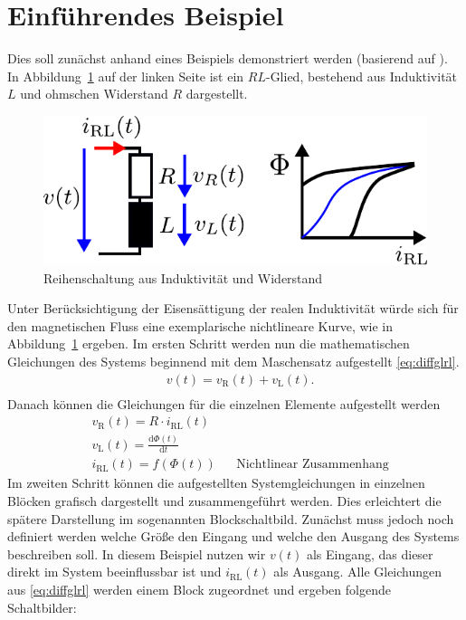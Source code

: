 \section{Einführendes Beispiel}
%
Dies soll zunächst anhand eines Beispiels demonstriert werden (basierend auf \cite{Foellinger94}). In Abbildung~\ref{fig:rlglied} auf der linken Seite ist ein $RL$-Glied, bestehend aus Induktivität $L$ und ohmschen Widerstand $R$ dargestellt.
%
\begin{figure}[h]
	\centering
	\includegraphics[width=0.5\linewidth]{Abbildungen/Modellbildung/PDF/RLglied.pdf}
	\caption{Reihenschaltung aus Induktivität und Widerstand}
	\label{fig:rlglied}
\end{figure}
%  
Unter Berücksichtigung der Eisensättigung der realen Induktivität würde sich für den magnetischen Fluss eine exemplarische nichtlineare Kurve, wie in Abbildung~\ref{fig:rlglied} ergeben.
Im ersten Schritt werden nun die mathematischen Gleichungen des Systems beginnend mit dem Maschensatz aufgestellt \eqref{eq:diffglrl}.
%
\begin{equation}
\begin{aligned}
	&v(t)=v_{\text{R}}(t)+v_{\text{L}}(t).\\
\end{aligned}
\end{equation}
%
Danach können die Gleichungen für die einzelnen Elemente aufgestellt werden
%
\begin{equation}
\begin{aligned}	
	&v_{\text{R}}(t) = R\cdot i_{\text{RL}}(t)\\
	&v_{\text{L}}(t) = \frac{\text{d}\Phi(t)}{\text{d}t}\\
	&i_{\text{RL}}(t) = f\left(\Phi(t)\right) &&\text{Nichtlinear Zusammenhang}\label{eq:diffglrl}
\end{aligned}
\end{equation}
%
Im zweiten Schritt können die aufgestellten Systemgleichungen in einzelnen Blöcken grafisch dargestellt und zusammengeführt werden. Dies erleichtert die spätere Darstellung im sogenannten Blockschaltbild. Zunächst muss jedoch noch definiert werden welche Größe den Eingang und welche den Ausgang des Systems beschreiben soll. In diesem Beispiel nutzen wir $v(t)$ als Eingang, das dieser direkt im System beeinflussbar ist und $i_{\text{RL}}(t)$ als Ausgang. Alle Gleichungen aus \eqref{eq:diffglrl} werden einem Block zugeordnet und ergeben folgende Schaltbilder:
